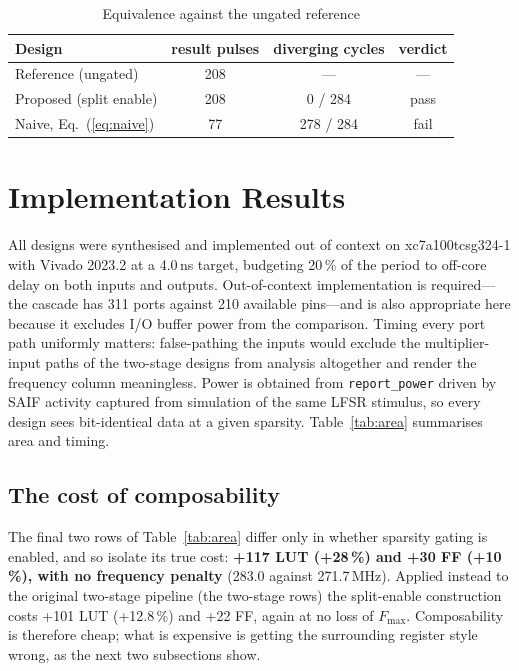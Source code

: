 \documentclass[journal,twocolumn]{IEEEtran}
\newcommand{\PART}{xc7a100tcsg324-1}
\begin{document}
\begin{table}[t]
\caption{Equivalence against the ungated reference}
\label{tab:verif}
\centering
\begin{tabular}{lccc}
\toprule
Design & result pulses & diverging cycles & verdict\\
\midrule
Reference (ungated)      & 208 & --- & ---\\
Proposed (split enable)  & 208 & 0 / 284 & pass\\
Naive, Eq.~(\ref{eq:naive}) & 77  & 278 / 284 & fail\\
\bottomrule
\end{tabular}
\end{table}

\section{Implementation Results}
\label{sec:results}
All designs were synthesised and implemented out of context on \PART{} with
Vivado 2023.2 at a 4.0\,ns target, budgeting 20\,\% of the period to off-core
delay on both inputs and outputs. Out-of-context implementation is
required---the cascade has 311 ports against 210 available pins---and is also
appropriate here because it excludes I/O buffer power from the comparison.
Timing every port path uniformly matters: false-pathing the inputs would
exclude the multiplier-input paths of the two-stage designs from analysis
altogether and render the frequency column meaningless. Power is obtained
from \texttt{report\_power} driven by SAIF activity captured from simulation
of the same LFSR stimulus, so every design sees bit-identical data at a given
sparsity. Table~\ref{tab:area} summarises area and timing.



\subsection{The cost of composability}
The final two rows of Table~\ref{tab:area} differ only in whether sparsity gating is
enabled, and so isolate its true cost: \textbf{+117 LUT (+28\,\%) and +30 FF
(+10\,\%), with no frequency penalty} (283.0 against 271.7\,MHz). Applied
instead to the original two-stage pipeline (the two-stage rows) the split-enable
construction costs +101 LUT (+12.8\,\%) and +22 FF, again at no loss of
$F_{\max}$. Composability is therefore cheap; what is expensive is getting the
surrounding register style wrong, as the next two subsections show.
\end{document}
